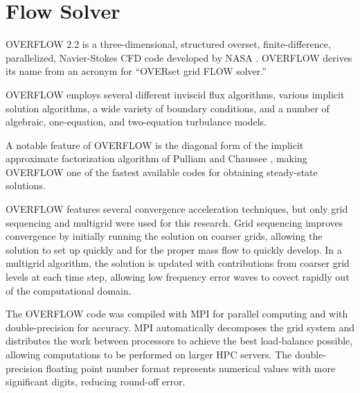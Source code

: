 \section{Flow Solver}

OVERFLOW 2.2 is a three-dimensional, structured overset, finite-difference, parallelized, Navier-Stokes CFD code developed by NASA \cite{Buning2004}. OVERFLOW derives its name from an acronym for “OVERset grid FLOW solver.” 

OVERFLOW employs several different inviscid flux algorithms, various implicit solution algorithms, a wide variety of boundary conditions, and a number of algebraic, one-equation, and two-equation turbulance models. 

A notable feature of OVERFLOW is the diagonal form of the implicit approximate factorization algorithm of Pulliam and Chaussee \cite{Pulliam1981}, making OVERFLOW one of the fastest available codes for obtaining steady-state solutions.

OVERFLOW features several convergence acceleration techniques, but only grid sequencing and multigrid were used for this research. Grid sequencing improves convergence by initially running the solution on coarser grids, allowing the solution to set up quickly and for the proper mass flow to quickly develop. In a multigrid algorithm, the solution is updated with contributions from coarser grid levels at each time step, allowing low frequency error waves to covect rapidly out of the computational domain.

The OVERFLOW code was compiled with MPI for parallel computing and with double-precision for accuracy. MPI automatically decomposes the grid system and distributes the work between processors to achieve the best load-balance possible, allowing computations to be performed on larger HPC servers. The double-precision floating point number format represents numerical values with more significant digits, reducing round-off error.
